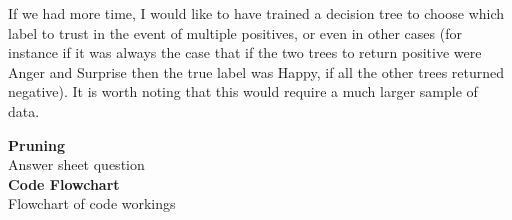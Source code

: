 \documentclass[12pt]{article}
\begin{document}
If we had more time, I would like to have trained a decision tree to choose which label to trust in the event of multiple positives, or even in other cases (for instance if it was always the case that if the two trees to return positive were Anger and Surprise then the true label was Happy, if all the other trees returned negative). It is worth noting that this would require a much larger sample of data.

{\bf Pruning} \\
Answer sheet question\\

{\bf Code Flowchart} \\
Flowchart of code workings\\
\end{document}
